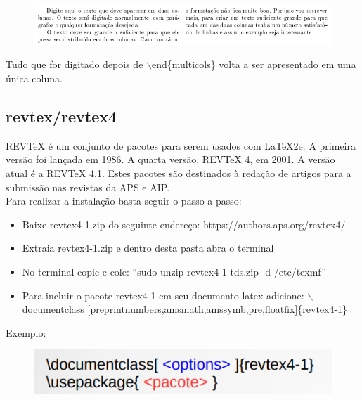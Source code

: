 \documentclass[12pt]{article}
\begin{document}
			\begin{figure}[h]
				\centering
				\includegraphics[scale=0.7]{exp.png}
			\end{figure}
			Tudo que for digitado depois de $\backslash$end\{{multicols}\} volta a ser apresentado em uma única coluna.
		
		\subsection{revtex/revtex4}
			REVTeX é um conjunto de pacotes para serem usados com LaTeX2e. A primeira versão foi lançada em 1986. A quarta versão, REVTeX 4, em 2001. A
			versão atual é a REVTeX 4.1. Estes pacotes são destinados à redação de artigos para a submissão
			nas revistas da APS e AIP.\\
			Para realizar a instalação basta seguir o passo a passo:\\
			\begin{itemize}
			
				\item Baixe revtex4-1.zip do seguinte endereço: https://authors.aps.org/revtex4/
				\item Extraia revtex4-1.zip e dentro desta pasta abra o terminal
				\item No terminal copie e cole:  “sudo unzip revtex4-1-tds.zip -d /etc/texmf”
				\item Para incluir o pacote  revtex4-1 em seu documento latex adicione: $\backslash$documentclass [preprintnumbers,amsmath,amssymb,pre,floatfix]\{{revtex4-1}\}
			
			\end{itemize}
			Exemplo:
			
			
			
			
			
			
			
			
			
			
			
			
			
			\begin{figure}[h]
				\centering
				\includegraphics[scale=0.6]{re.png}
			\end{figure}
		
\end{document}
